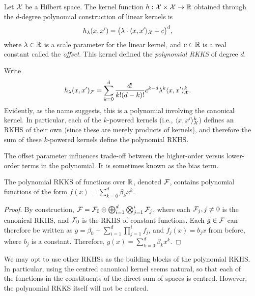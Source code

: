 \begin{definition}
  Let ${\mathcal X}$ be a Hilbert space.
  The kernel function $h:{\mathcal X}\times{\mathcal X}\to\mathbb{R}$ obtained through the $d$-degree polynomial construction of linear kernels is
  \[
    h_\lambda(x,x') = \big(\lambda\cdot\langle x,x'\rangle_{\mathcal X} + c\big)^d,
  \]
  where $\lambda \in \mathbb{R}$ is a scale parameter for the linear kernel, and $c \in \mathbb{R}$ is a real constant called the \emph{offset}.
  This kernel defined the \emph{polynomial RKKS} of degree $d$.
\end{definition}

Write
\begin{align*}
  h_\lambda(x,x')_{\mathcal F} = \sum_{k=0}^d \frac{d!}{k!(d-k)!} c^{k-d} \lambda^k \langle x,x'\rangle_{\mathcal X}^k.
\end{align*}
Evidently, as the name suggests, this is a polynomial involving the canonical kernel.
In particular, each of the $k$-powered kernels (i.e., $\langle x,x'\rangle_{\mathcal X}^k$) defines an RKHS of their own (since these are merely products of kernels), and therefore the sum of these $k$-powered kernels define the polynomial RKHS.

The offset parameter influences trade-off between the higher-order versus lower-order terms in the polynomial.
It is sometimes known as the bias term.

\begin{claim}
  The polynomial RKKS of functions over $\mathbb{R}$, denoted ${\mathcal F}$, contains polynomial functions of the form $f(x)=\sum_{k=0}^d \beta_k x^k$.
\end{claim}

\begin{proof}
  By construction, ${\mathcal F} = {\mathcal F}_0 \oplus \bigoplus_{i=1}^d\bigotimes_{j=1}^i {\mathcal F}_j$, where each ${\mathcal F}_j, j \neq 0$ is the canonical RKHS, and ${\mathcal F}_0$ is the RKHS of constant functions.
  Each $g \in {\mathcal F}$ can therefore be written as $g = \beta_0 + \sum_{i=1}^d\prod_{j=1}^i f_j$, and $f_j(x)= b_j x$ from before, where $b_j$ is a constant.
  Therefore, $g(x) = \sum_{k=0}^d \beta_k x^k$.
\end{proof}

\begin{remark}
  We may opt to use other RKHSs as the building blocks of the polynomial RKHS.
  In particular, using the centred canonical kernel seems natural, so that each of the functions in the constituents of the direct sum of spaces is centred.
  However, the polynomial RKKS itself will not be centred.
\end{remark}


